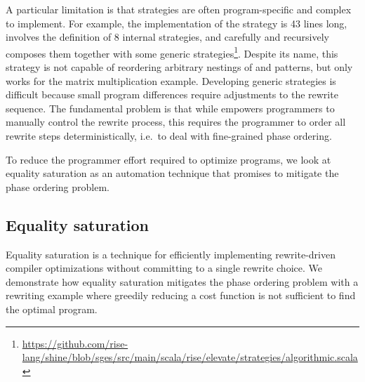 A particular limitation is that strategies are often program-specific and complex to implement.
For example, the implementation of the  strategy is 43 lines long, involves the definition of 8 internal strategies, and carefully and recursively composes them together with some generic strategies\footnote{\tiny\url{https://github.com/rise-lang/shine/blob/sges/src/main/scala/rise/elevate/strategies/algorithmic.scala}}.
Despite its name, this  strategy is not capable of reordering arbitrary nestings of  and  patterns, but only works for the matrix multiplication example.
Developing generic strategies is difficult because small program differences require adjustments to the rewrite sequence.
The fundamental problem is that while \Elevate{} empowers programmers to manually control the rewrite process, this requires the programmer to order all rewrite steps deterministically, i.e.\  to deal with fine-grained phase ordering.

To reduce the programmer effort required to optimize \Rise{} programs, we look at equality saturation as an automation technique that promises to mitigate the phase ordering problem.

\subsection{Equality saturation}
\label{eqsat}

Equality saturation \cite{tate2009-equality-saturation, willsey2021-egg} is a technique for efficiently implementing rewrite-driven compiler optimizations without committing to a single rewrite choice.
We demonstrate how equality saturation mitigates the phase ordering problem with a rewriting example where greedily reducing a cost function is not sufficient to find the optimal program.


